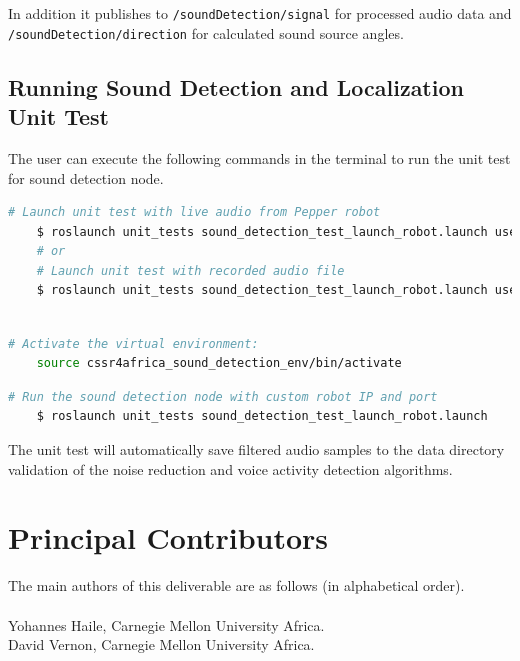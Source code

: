 \documentclass{CSSRforAfrica}
\newcommand{\blank}{~\\}
\begin{document}
In addition it publishes to \texttt{/soundDetection/signal} for processed audio data and \\
 \texttt{/soundDetection/direction} for calculated sound source angles.

\subsection*{Running Sound Detection and Localization Unit Test}
The user can execute the following commands in the terminal to run the unit test for sound detection node.
\begin{lstlisting}[style=withoutNumbering, language=bash]
	# Launch unit test with live audio from Pepper robot
	$ roslaunch unit_tests sound_detection_test_launch_robot.launch use_recorded_audio:=false
	# or
	# Launch unit test with recorded audio file
	$ roslaunch unit_tests sound_detection_test_launch_robot.launch use_recorded_audio:=true audio_file:=sound_distance
	
\end{lstlisting}
\begin{lstlisting}[style=withoutNumbering, language=bash]
	# Activate the virtual environment:
	source cssr4africa_sound_detection_env/bin/activate
\end{lstlisting}
\begin{lstlisting}[style=withoutNumbering, language=bash]
	# Run the sound detection node with custom robot IP and port
	$ roslaunch unit_tests sound_detection_test_launch_robot.launch
\end{lstlisting}

The unit test will automatically save filtered audio samples to the data directory validation of the noise reduction and voice activity detection algorithms.

\newpage


\pagebreak
\section*{Principal Contributors}
\label{contributors}
The main authors of this deliverable are as follows (in alphabetical order).
\blank
~
\blank
Yohannes Haile, Carnegie Mellon University Africa.\\    %
David Vernon, Carnegie Mellon University Africa. \\                                                                           %
 
\end{document}
